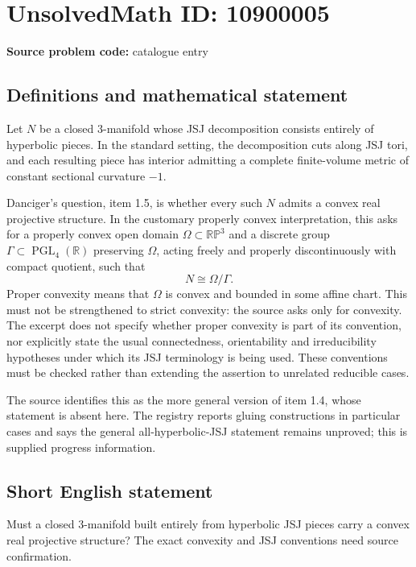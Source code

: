 \documentclass[11pt]{article}
\newcommand{\R}{\mathbb{R}}
\begin{document}
\section*{UnsolvedMath ID: 10900005}
\textbf{Source problem code:} catalogue entry
\subsection{Definitions and mathematical statement}
Let $N$ be a closed $3$-manifold whose JSJ decomposition consists entirely of hyperbolic pieces. In the standard setting, the decomposition cuts along JSJ tori, and each resulting piece has interior admitting a complete finite-volume metric of constant sectional curvature $-1$.

Danciger's question, item 1.5, is whether every such $N$ admits a convex real projective structure. In the customary properly convex interpretation, this asks for a properly convex open domain $\Omega\subset\mathbb{RP}^3$ and a discrete group $\Gamma\subset\operatorname{PGL}_4(\R)$ preserving $\Omega$, acting freely and properly discontinuously with compact quotient, such that
\[
 N\cong\Omega/\Gamma.
\]
Proper convexity means that $\Omega$ is convex and bounded in some affine chart. This must not be strengthened to strict convexity: the source asks only for convexity. The excerpt does not specify whether proper convexity is part of its convention, nor explicitly state the usual connectedness, orientability and irreducibility hypotheses under which its JSJ terminology is being used. These conventions must be checked rather than extending the assertion to unrelated reducible cases.

The source identifies this as the more general version of item 1.4, whose statement is absent here. The registry reports gluing constructions in particular cases and says the general all-hyperbolic-JSJ statement remains unproved; this is supplied progress information.
\subsection{Short English statement}
Must a closed $3$-manifold built entirely from hyperbolic JSJ pieces carry a convex real projective structure? The exact convexity and JSJ conventions need source confirmation.
\end{document}
